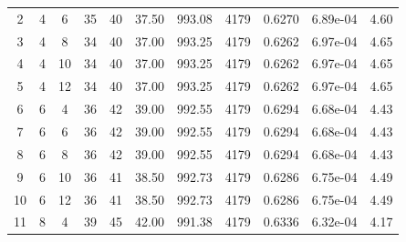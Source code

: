 {\begin{longtable}{|c|c|c|c|c|c|c|c|c|c|c|}
            2            & 4              & 6              & 35                  & 40                   & 37.50                & 993.08            & 4179               & 0.6270               & 6.89e-04         & 4.60            \\
            3            & 4              & 8              & 34                  & 40                   & 37.00                & 993.25            & 4179               & 0.6262               & 6.97e-04         & 4.65            \\
            4            & 4              & 10             & 34                  & 40                   & 37.00                & 993.25            & 4179               & 0.6262               & 6.97e-04         & 4.65            \\
            5            & 4              & 12             & 34                  & 40                   & 37.00                & 993.25            & 4179               & 0.6262               & 6.97e-04         & 4.65            \\ \hline
            6            & 6              & 4              & 36                  & 42                   & 39.00                & 992.55            & 4179               & 0.6294               & 6.68e-04         & 4.43            \\
            7            & 6              & 6              & 36                  & 42                   & 39.00                & 992.55            & 4179               & 0.6294               & 6.68e-04         & 4.43            \\
            8            & 6              & 8              & 36                  & 42                   & 39.00                & 992.55            & 4179               & 0.6294               & 6.68e-04         & 4.43            \\
            9            & 6              & 10             & 36                  & 41                   & 38.50                & 992.73            & 4179               & 0.6286               & 6.75e-04         & 4.49            \\
            10           & 6              & 12             & 36                  & 41                   & 38.50                & 992.73            & 4179               & 0.6286               & 6.75e-04         & 4.49            \\ \hline
            11           & 8              & 4              & 39                  & 45                   & 42.00                & 991.38            & 4179               & 0.6336               & 6.32e-04         & 4.17            \\

\end{longtable}}
